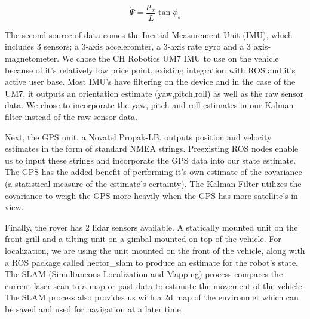 \begin{equation}
\dot{\Psi} = \frac{\mu_x}{L}\tan{\phi_s}
\end{equation}

The second source of data comes the Inertial Measurement Unit (IMU), which includes 3 sensors; a 3-axis acceleromter, a 3-axis rate gyro and a 3 axis-magnetometer. We chose the CH Robotics UM7 IMU to use on the vehicle because of it's relatively low price point, existing integration with ROS and it's active user base. Most IMU's have filtering on the device and in the case of the UM7, it outputs an orientation estimate (yaw,pitch,roll) as well as the raw sensor data. We chose to incorporate the yaw, pitch and roll estimates in our Kalman filter instead of the raw sensor data. 

Next, the GPS unit, a Novatel Propak-LB, outputs position and velocity estimates in the form of standard NMEA strings. Preexisting ROS nodes enable us to input these strings and incorporate the GPS data into our state estimate. The GPS has the added benefit of performing it's own estimate of the covariance (a statistical measure of the estimate's certainty). The Kalman Filter utilizes the covariance to weigh the GPS more heavily when the GPS has more satellite's in view.

Finally, the rover has 2 lidar sensors available. A statically mounted unit on the front grill and a tilting unit on a gimbal mounted on top of the vehicle. For localization, we are using the unit mounted on the front of the vehicle, along with a ROS package called hector\_slam to produce an estimate for the robot's state. The SLAM (Simultaneous Localization and Mapping) process compares the current laser scan to a map or past data to estimate the movement of the vehicle. The SLAM process also provides us with a 2d map of the environmet which can be saved and used for navigation at a later time.